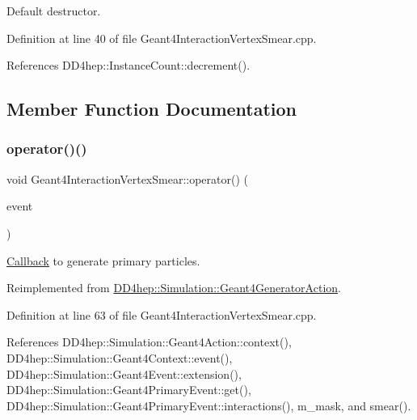 Default destructor. 



Definition at line 40 of file Geant4\+Interaction\+Vertex\+Smear.\+cpp.



References D\+D4hep\+::\+Instance\+Count\+::decrement().



\subsection{Member Function Documentation}
\hypertarget{class_d_d4hep_1_1_simulation_1_1_geant4_interaction_vertex_smear_ada2914ca2a761ff0e1ccbbcc8bef578e}{}\label{class_d_d4hep_1_1_simulation_1_1_geant4_interaction_vertex_smear_ada2914ca2a761ff0e1ccbbcc8bef578e} 
\subsubsection{\texorpdfstring{operator()()}{operator()()}}
{\footnotesize\ttfamily void Geant4\+Interaction\+Vertex\+Smear\+::operator() (\begin{DoxyParamCaption}\item[{G4\+Event $\ast$}]{event }\end{DoxyParamCaption})\hspace{0.3cm}{\ttfamily [virtual]}}



\hyperlink{class_d_d4hep_1_1_callback}{Callback} to generate primary particles. 



Reimplemented from \hyperlink{class_d_d4hep_1_1_simulation_1_1_geant4_generator_action_ac5a1d2335a19e3f9d555081199e01801}{D\+D4hep\+::\+Simulation\+::\+Geant4\+Generator\+Action}.



Definition at line 63 of file Geant4\+Interaction\+Vertex\+Smear.\+cpp.



References D\+D4hep\+::\+Simulation\+::\+Geant4\+Action\+::context(), D\+D4hep\+::\+Simulation\+::\+Geant4\+Context\+::event(), D\+D4hep\+::\+Simulation\+::\+Geant4\+Event\+::extension(), D\+D4hep\+::\+Simulation\+::\+Geant4\+Primary\+Event\+::get(), D\+D4hep\+::\+Simulation\+::\+Geant4\+Primary\+Event\+::interactions(), m\+\_\+mask, and smear().

